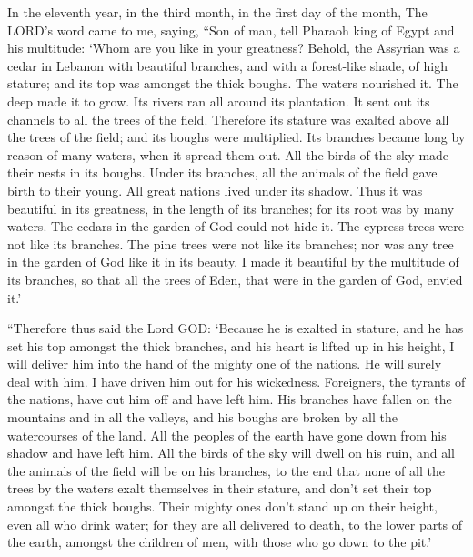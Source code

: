  In the eleventh year, in the third month, in the first
day of the month, The LORD's word came to me, saying, 
``Son of man, tell Pharaoh king of Egypt and his multitude: `Whom are
you like in your greatness?  Behold, the Assyrian was a
cedar in Lebanon with beautiful branches, and with a forest-like shade,
of high stature; and its top was amongst the thick boughs.
 The waters nourished it. The deep made it to grow. Its
rivers ran all around its plantation. It sent out its channels to all
the trees of the field.  Therefore its stature was exalted
above all the trees of the field; and its boughs were multiplied. Its
branches became long by reason of many waters, when it spread them out.
 All the birds of the sky made their nests in its boughs.
Under its branches, all the animals of the field gave birth to their
young. All great nations lived under its shadow.  Thus it
was beautiful in its greatness, in the length of its branches; for its
root was by many waters.  The cedars in the garden of God
could not hide it. The cypress trees were not like its branches. The
pine trees were not like its branches; nor was any tree in the garden of
God like it in its beauty.  I made it beautiful by the
multitude of its branches, so that all the trees of Eden, that were in
the garden of God, envied it.'

 ``Therefore thus said the Lord GOD: `Because he is
exalted in stature, and he has set his top amongst the thick branches,
and his heart is lifted up in his height,  I will deliver
him into the hand of the mighty one of the nations. He will surely deal
with him. I have driven him out for his wickedness. 
Foreigners, the tyrants of the nations, have cut him off and have left
him. His branches have fallen on the mountains and in all the valleys,
and his boughs are broken by all the watercourses of the land. All the
peoples of the earth have gone down from his shadow and have left him.
 All the birds of the sky will dwell on his ruin, and all
the animals of the field will be on his branches,  to the
end that none of all the trees by the waters exalt themselves in their
stature, and don't set their top amongst the thick boughs. Their mighty
ones don't stand up on their height, even all who drink water; for they
are all delivered to death, to the lower parts of the earth, amongst the
children of men, with those who go down to the pit.'


